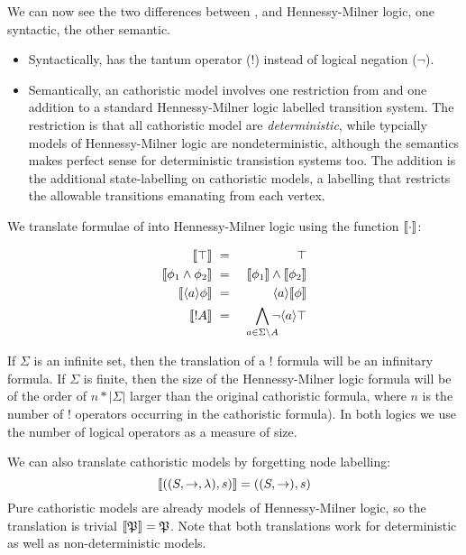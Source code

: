 \NI We can now see the two differences between \cathoristic{}, and
Hennessy-Milner logic, one syntactic, the other semantic.

\begin{itemize}

\item Syntactically, \cathoristic{} has the tantum operator ($!$) instead of
  logical negation ($\neg$).

\item Semantically, an cathoristic model involves one restriction from
  and one addition to a standard Hennessy-Milner logic labelled transition system. The
  restriction is that all cathoristic model are \emph{deterministic},
  while typcially models of Hennessy-Milner logic are
  nondeterministic, although the semantics makes perfect sense for
  deterministic transistion systems too. The addition is the
  additional state-labelling on cathoristic models, a labelling that
  restricts the allowable transitions emanating from each vertex.

\end{itemize}

\NI We translate formulae of \cathoristic{} into Hennessy-Milner logic using the function
$\lbrack\!\lbrack \cdot \rbrack\!\rbrack$:

\begin{eqnarray*}
  \SEMB{\top} & \ = \ & \top  \\
  \SEMB{\phi_1 \AND \phi_2} & \ = \ & \SEMB{\phi_1} \AND \SEMB{\phi_2}  \\
  \SEMB{\langle a \rangle \phi} & \ = \ & \langle a \rangle \SEMB{\phi}  \\
  \SEMB{! A} & \ = \ & \bigwedge_{a \in \Sigma \setminus A}\!\!\!\! \neg \langle a \rangle \top 
\end{eqnarray*}

\NI If $\Sigma$ is an infinite set, then the translation of a $!$
formula will be an infinitary formula.  If $\Sigma$ is finite, then
the size of the Hennessy-Milner logic formula will be of the order of $n * | \Sigma |$
larger than the original cathoristic formula, where $n$ is the number of
$!$ operators occurring in the cathoristic formula). In both logics we
use the number of logical operators as a measure of size.

We can also translate cathoristic models by forgetting node labelling:
\[
   \lbrack\!\lbrack ((S, \rightarrow, \lambda), s) \rbrack\!\rbrack 
      =
   ((S, \rightarrow), s)
\]
Pure cathoristic models are already models of Hennessy-Milner logic, so the
translation is trivial $\lbrack\!\lbrack \frak{P} \rbrack\!\rbrack = \frak{P}$. Note that both
translations work for deterministic as well as non-deterministic
models.

